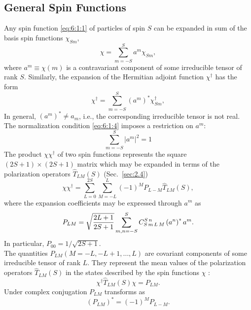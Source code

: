 \subsection{General Spin Functions}\label{sec:6.1.4}
Any spin function \eqref{eq:6:1:1} of particles of spin $S$ can be expanded in sum of the basis spin functions $\chi_{S m}$,
\begin{equation}
\chi=\sum_{m=-S}^{S} a^{m} \chi_{S m}, \label{eq:6:1:28}
\end{equation}
where $a^{m} \equiv \chi(m)$ is a contravariant component of some irreducible tensor of rank $S$. Similarly, the expansion of the Hermitian adjoint function $\chi^{\dagger}$ has the form
\begin{equation}
\chi^{\dagger}=\sum_{m=-S}^{S}\left(a^{m}\right)^{*} \chi_{S m}^{\dagger}, \label{eq:6:1:29}
\end{equation}
In general, $\left(a^{m}\right)^{*} \neq a_{m}$, i.e., the corresponding irreducible tensor is not real. The normalization condition \eqref{eq:6:1:4} imposes a restriction on $a^{m}$:
\[
\sum_{m=-S}^{S}\left|a^{m}\right|^{2}=1
\]
The product $\chi \chi^{\dagger}$ of two spin functions represents the square $(2 S+1) \times(2 S+1)$ matrix which may be expanded in terms of the polarization operators $\widehat{T}_{L M}(S)$ (Sec.~\ref{sec:2.4})
\begin{equation}
\chi \chi^{\dagger}=\sum_{L=0}^{2 S} \sum_{M=-L}^{L}(-1)^{M} P_{L-M} \hat{T}_{L M}(S), \label{eq:6:1:30}
\end{equation}
where the expansion coefficients may be expressed through $a^{m}$ as
\begin{equation}
P_{L M}=\sqrt{\frac{2 L+1}{2 S+1}} \sum_{m, n=-S}^{S} C_{S\,m\,L\,M}^{S\,n}\left(a^{n}\right)^{*} a^{m} . \label{eq:6:1:31}
\end{equation}
In particular, $P_{00}=1 / \sqrt{2 S+1}$.\\
The quantities $P_{L M}(M=-L,-L+1, \ldots, L)$ are covariant components of some irreducible tensor of rank $L$. They represent the mean values of the polarization operators $\widehat{T}_{L M}(S)$ in the states described by the spin functions $\chi$ :
\begin{equation}
\chi^{\dagger} \hat{T}_{L M}(S) \chi=P_{L M} . \label{eq:6:1:32}
\end{equation}
Under complex conjugation $P_{L M}$ transforms as
\begin{equation}
\left(P_{L M}\right)^{*}=(-1)^{M} P_{L-M} . \label{eq:6:1:33}
\end{equation}
